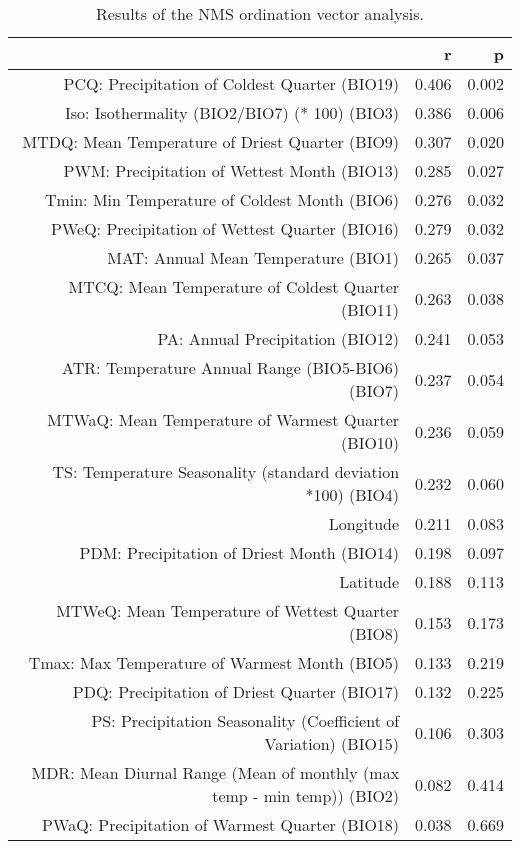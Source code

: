 \begin{table}[ht]
\centering
\begin{tabular}{rrr}
  \hline
 & r & p \\ 
  \hline
PCQ: Precipitation of Coldest Quarter (BIO19) & 0.406 & 0.002 \\ 
  Iso: Isothermality (BIO2/BIO7) (* 100) (BIO3) & 0.386 & 0.006 \\ 
  MTDQ: Mean Temperature of Driest Quarter (BIO9) & 0.307 & 0.020 \\ 
  PWM: Precipitation of Wettest Month (BIO13) & 0.285 & 0.027 \\ 
  Tmin: Min Temperature of Coldest Month (BIO6) & 0.276 & 0.032 \\ 
  PWeQ: Precipitation of Wettest Quarter (BIO16) & 0.279 & 0.032 \\ 
  MAT: Annual Mean Temperature (BIO1) & 0.265 & 0.037 \\ 
  MTCQ: Mean Temperature of Coldest Quarter (BIO11) & 0.263 & 0.038 \\ 
  PA: Annual Precipitation (BIO12) & 0.241 & 0.053 \\ 
  ATR: Temperature Annual Range (BIO5-BIO6) (BIO7) & 0.237 & 0.054 \\ 
  MTWaQ: Mean Temperature of Warmest Quarter (BIO10) & 0.236 & 0.059 \\ 
  TS: Temperature Seasonality (standard deviation *100) (BIO4) & 0.232 & 0.060 \\ 
  Longitude & 0.211 & 0.083 \\ 
  PDM: Precipitation of Driest Month (BIO14) & 0.198 & 0.097 \\ 
  Latitude & 0.188 & 0.113 \\ 
  MTWeQ: Mean Temperature of Wettest Quarter (BIO8) & 0.153 & 0.173 \\ 
  Tmax: Max Temperature of Warmest Month (BIO5) & 0.133 & 0.219 \\ 
  PDQ: Precipitation of Driest Quarter (BIO17) & 0.132 & 0.225 \\ 
  PS: Precipitation Seasonality (Coefficient of Variation) (BIO15) & 0.106 & 0.303 \\ 
  MDR: Mean Diurnal Range (Mean of monthly (max temp - min temp)) (BIO2) & 0.082 & 0.414 \\ 
  PWaQ: Precipitation of Warmest Quarter (BIO18) & 0.038 & 0.669 \\ 
   \hline
\end{tabular}
\caption{Results of the NMS ordination vector analysis.} 
\label{tab:wc_vec}
\end{table}
